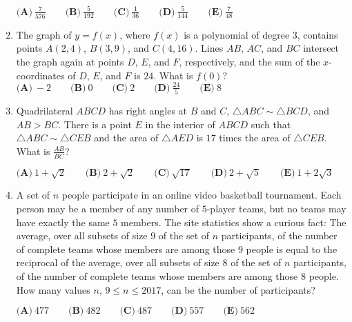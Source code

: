 \documentclass{article}
\begin{document}
\begin{enumerate}[label=\arabic*., itemsep=0.5em]
\(\textbf{(A)}\ \frac{7}{576} \qquad \textbf{(B)}\ \frac{5}{192} \qquad \textbf{(C)}\ \frac{1}{36} \qquad \textbf{(D)}\ \frac{5}{144} \qquad\textbf{(E)}\ \frac{7}{48}\)\par \vspace{0.5em}\item The graph of \(y=f(x)\), where \(f(x)\) is a polynomial of degree \(3\), contains points \(A(2,4)\), \(B(3,9)\), and \(C(4,16)\). Lines \(AB\), \(AC\), and \(BC\) intersect the graph again at points \(D\), \(E\), and \(F\), respectively, and the sum of the \(x\)-coordinates of \(D\), \(E\), and \(F\) is \(24\). What is \(f(0)\)?
\(\textbf{(A)}\ -2 \qquad \textbf{(B)}\ 0 \qquad \textbf{(C)}\ 2 \qquad \textbf{(D)}\ \frac{24}{5} \qquad\textbf{(E)}\ 8\)\par \vspace{0.5em}\item Quadrilateral \(ABCD\) has right angles at \(B\) and \(C\), \(\triangle ABC \sim \triangle BCD\), and \(AB > BC\). There is a point \(E\) in the interior of \(ABCD\) such that \(\triangle ABC \sim \triangle CEB\) and the area of \(\triangle AED\) is \(17\) times the area of \(\triangle CEB\). What is \(\frac{AB}{BC}\)?

\(\textbf{(A)}\ 1 + \sqrt{2} \qquad \textbf{(B)}\ 2 + \sqrt{2} \qquad \textbf{(C)}\ \sqrt{17} \qquad \textbf{(D)}\ 2 + \sqrt{5} \qquad\textbf{(E)}\ 1 + 2\sqrt{3}\)\par \vspace{0.5em}\item A set of \(n\) people participate in an online video basketball tournament. Each person may be a member of any number of \(5\)-player teams, but no teams may have exactly the same \(5\) members. The site statistics show a curious fact: The average, over all subsets of size \(9\) of the set of \(n\) participants, of the number of complete teams whose members are among those 9 people is equal to the reciprocal of the average, over all subsets of size \(8\) of the set of \(n\) participants, of the number of complete teams whose members are among those \(8\) people. How many values \(n\), \(9 \leq n \leq 2017\), can be the number of participants?

\(\textbf{(A)}\ 477 \qquad \textbf{(B)}\ 482 \qquad \textbf{(C)}\ 487 \qquad \textbf{(D)}\ 557 \qquad\textbf{(E)}\ 562\)\par \vspace{0.5em}\end{enumerate}
\end{document}
